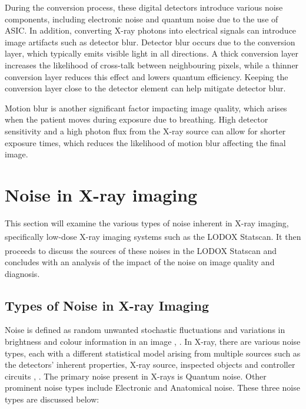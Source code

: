 During the conversion process, these digital detectors introduce various noise components, including electronic noise and quantum noise due to the use of \gls{ASIC}. In addition, converting X-ray photons into electrical signals can introduce image artifacts such as detector blur. Detector blur occurs due to the conversion layer, which typically emits visible light in all directions. A thick conversion layer increases the likelihood of cross-talk between neighbouring pixels, while a thinner conversion layer reduces this effect and lowers quantum efficiency. Keeping the conversion layer close to the detector element can help mitigate detector blur.

Motion blur is another significant factor impacting image quality, which arises when the patient moves during exposure due to breathing. High detector sensitivity and a high photon flux from the X-ray source can allow for shorter exposure times, which reduces the likelihood of motion blur affecting the final image.




\section{Noise in X-ray imaging}
\label{ch:LitReview:Noise in X-ray imaging}
This section will examine the various types of noise inherent in X-ray imaging, specifically low-dose X-ray imaging systems such as the LODOX\textsuperscript{\textregistered} Statscan\textsuperscript{\textregistered}. It then proceeds to discuss the sources of these noises in the LODOX\textsuperscript{\textregistered} Statscan\textsuperscript{\textregistered} and concludes with an analysis of the impact of the noise on image quality and diagnosis. 


\subsection{Types of Noise in X-ray Imaging}
\label{ch:LitReview:Types of Noise in X-ray Imaging}
Noise is defined as random unwanted stochastic fluctuations and variations in brightness and colour information in an image \cite{veldkamp_dose_2009}, \cite{lahmiri_iterative_2017}. In X-ray, there are various noise types, each with a different statistical model arising from multiple sources such as the detectors' inherent properties, X-ray source, inspected objects and controller circuits \cite{seibert_tradeoffs_2004}, \cite{noauthor_noise_nodate}. The primary noise present in X-rays is Quantum noise. Other prominent noise types include Electronic and Anatomical noise. These three noise types are discussed below:


